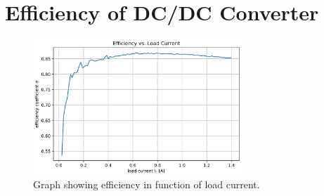 \documentclass[a4paper,12pt]{article}
\begin{document}

\section{Efficiency of DC/DC Converter}

\begin{figure}[h]
\begin{center}
\includegraphics[width=0.70\textwidth]{graphics/Efficiency_vs_LoadCurrent.png}
\caption{Graph showing efficiency in function of load current.}
\end{center}
\end{figure}
\end{document}

